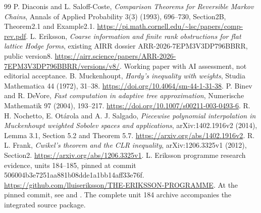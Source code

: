 \documentclass[11pt]{article}
\begin{document}
\begin{thebibliography}{99}
 P. Diaconis and L. Saloff-Coste,
\emph{Comparison Theorems for Reversible Markov Chains},
Annals of Applied Probability 3(3) (1993), 696--730,
Section2B, Theorem2.1 and Example2.1.
\url{https://pi.math.cornell.edu/~lsc/papers/comp-rev.pdf}. L. Eriksson, \emph{Coarse information and finite rank
obstructions for flat lattice Hodge forms}, existing AIRR dossier
ARR-2026-7EPM3V3DP796BBRR, public version8.
\url{https://airr.science/papers/ARR-2026-7EPM3V3DP796BBRR/versions/v8/}.
Working paper with AI assessment, not editorial acceptance.
 B. Muckenhoupt, \emph{Hardy's inequality with weights},
Studia Mathematica 44 (1972), 31--38.
\url{https://doi.org/10.4064/sm-44-1-31-38}.
 P. Binev and R. DeVore, \emph{Fast computation in adaptive
tree approximation}, Numerische Mathematik 97 (2004), 193--217.
\url{https://doi.org/10.1007/s00211-003-0493-6}.
 R. H. Nochetto, E. Ot\'arola and A. J. Salgado,
\emph{Piecewise polynomial interpolation in Muckenhoupt weighted Sobolev
spaces and applications}, arXiv:1402.1916v2 (2014), Lemma 3.1,
Section 5.2 and Theorem 5.7. \url{https://arxiv.org/abs/1402.1916v2}.
 R. L. Frank, \emph{Cwikel's theorem and the CLR inequality},
arXiv:1206.3325v1 (2012), Section2.
\url{https://arxiv.org/abs/1206.3325v1}.
 L. Eriksson programme research evidence, units 184--185,
pinned at commit 506004b3e7251aa881b08dde1a1bb14aff33e76f.
\url{https://github.com/lluiseriksson/THE-ERIKSSON-PROGRAMME}.
At the pinned commit, see 
and .
The complete unit 184 archive accompanies the integrated source package.

\end{thebibliography}
\end{document}
